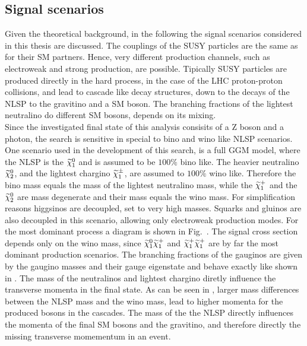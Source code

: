 \subsection{Signal scenarios}\label{sec:SMS}
Given the theoretical background, in the following the signal scenarios considered in this thesis are discussed. The couplings of the SUSY particles are the same as for their SM partners. Hence, very different production channels, such as electroweak and strong production, are possible. Tipically SUSY particles are produced directly in the hard process, in the case of the LHC proton-proton collisions, and lead to cascade like decay structures, down to the decays of the NLSP to the gravitino and a SM boson. The branching fractions of the lightest neutralino do different SM bosons, depends on its mixing. \\
Since the investigated final state of this analysis consisits of a Z boson and a photon, the search is sensitive in special to bino and wino like NLSP scenarios.\\
One scenario used in the development of this search, is a full GGM model, where the NLSP is the $\widetilde{\chi}^{0}_{1}$ and is assumed to be $100\%$ bino like. The heavier neutralino $\widetilde{\chi}^{0}_{2}$, and the lightest chargino $\widetilde{\chi}^\pm_{1}$, are assumed to $100\%$ wino like. Therefore the bino mass equals the mass of the lightest neutralino mass, while the $\widetilde{\chi}^{+}_{1}$ and the $\widetilde{\chi}^{0}_{2}$ are mass degenerate and their mass equals the wino mass. For simplification reasons higgsinos are decoupled, \ie set to very high masses. Squarks and gluinos are also decoupled in this scenario, allowing only electroweak production modes. For the most dominant process a diagram  is shown in Fig.~. The signal cross section depends only on the wino mass, since $\widetilde{\chi}^{0}_{1}\widetilde{\chi}^{+}_{1}$ and $\widetilde{\chi}^{+}_{1}\widetilde{\chi}^{+}_{1}$ are by far the most dominant production scenarios. The branching fractions of the gauginos are given by the gaugino masses and their gauge eigenstate and behave exactly like shown in . The mass of the neutralinos and lightest chargino diretly influence the transverse momenta in the final state. As can be seen in , larger mass differences between the NLSP mass and the wino mass, lead to higher momenta for the produced bosons in the cascades. The mass of the the NLSP directly influences the momenta of the final SM bosons and the gravitino, and therefore directly the missing transverse momementum in an event.\\

